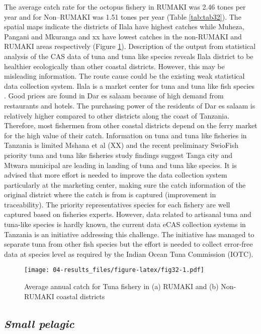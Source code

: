 \documentclass[
  12pt,
  a4paper,
  oneside]{book}
\begin{document}
The average catch rate for the octopus fishery in RUMAKI was 2.46 tones per year and for Non--RUMAKI was 1.51 tones per year (Table \ref{tab:tab32}). The spatial maps indicate the districts of Ilala have highest catches while Muheza, Pangani and Mkuranga and xx have lowest catches in the non-RUMAKI and RUMAKI areas respectively (Figure \ref{fig:fig32}). Description of the output from statistical analysis of the CAS data of tuna and tuna like species reveals Ilala district to be healthier ecologically than other coastal districts. However, this may be misleading information. The route cause could be the existing weak statistical data collection system. Ilala is a market center for tuna and tuna like fish species . Good prices are found in Dar es salaam because of high demand from restaurants and hotels. The purchasing power of the residents of Dar es salaam is relatively higher compared to other districts along the coast of Tanzania. Therefore, most fishermen from other coastal districts depend on the ferry market for the high value of their catch. Information on tuna and tuna like fisheries in Tanzania is limited Mshana et al (XX) and the recent preliminary SwioFish priority tuna and tuna like fisheries study findings suggest Tanga city and Mtwara municipal are leading in landing of tuna and tuna like species. It is advised that more effort is needed to improve the data collection system particularly at the marketing center, making sure the catch information of the original district where the catch is from is captured (improvement in traceability). The priority representatives species for each fishery are well captured based on fisheries experts. However, data related to artisanal tuna and tuna-like species is hardly known, the current data eCAS collection systems in Tanzania is an initiative addressing this challenge. The initiative has managed to separate tuna from other fish species but the effort is needed to collect error-free data at species level as required by the Indian Ocean Tuna Commission (IOTC).

\begin{figure}
\centering
\texttt{[image: 04-results\_files/figure-latex/fig32-1.pdf]}
\caption{\label{fig:fig32}Average annual catch for Tuna fishery in (a) RUMAKI and (b) Non-RUMAKI coastal districts}
\end{figure}

\hypertarget{small-pelagic}{%
\subsection{\texorpdfstring{\emph{Small pelagic}}{Small pelagic}}\label{small-pelagic}}
\end{document}
